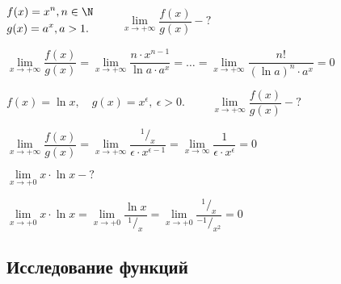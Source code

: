 \begin{example}
	$\begin{gathered}
		f(x) = x^{n}, n\in \N \\
		g(x) = a^{x}, a > 1. \hfill
	\end{gathered} $ $\quad \quad  \lim\limits_{x\to +\infty} \dfrac{f(x)}{g(x)} - ?$
\end{example}
\begin{solution}
	$\lim\limits_{x\to +\infty} \dfrac{f(x)}{g(x)} = \lim\limits_{x\to +\infty} \dfrac{n \cdot x^{n-1}}{\ln a\cdot a^{x}} = \ldots = \lim\limits_{x\to +\infty} \dfrac{n!}{\left(\ln a\right)^{n} \cdot a^{x}} = 0$
\end{solution}

\begin{example}
	$f(x) = \ln x, \quad g(x) = x^{\epsilon}, \ \epsilon > 0$. $\quad \quad \lim\limits_{x\to +\infty} \dfrac{f(x)}{g(x)} - ?$
\end{example} 
\begin{solution}
	$\lim\limits_{x\to +\infty} \dfrac{f(x)}{g(x)} = \lim\limits_{x\to +\infty} \dfrac{^{1}/_{x}}{\epsilon \cdot x^{\epsilon-1}} = \lim\limits_{x\to\infty}\dfrac{1}{\epsilon \cdot x^{\epsilon}}=0$
\end{solution}

\begin{example}
	$\lim\limits_{x\to+0} x\cdot \ln x - ?$
\end{example}
\begin{solution}
	$\lim\limits_{x\to+0} x\cdot \ln x = \lim\limits_{x\to +0} \dfrac{\ln x}{^{1}/_{x}} = \lim\limits_{x\to +0} \dfrac{^1/_x}{^{-1}/_{x^{2}}} = 0$
\end{solution}

\subsection{Исследование функций}

